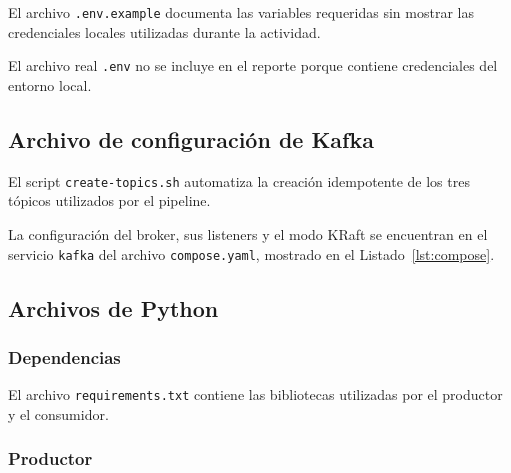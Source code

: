 

El archivo \texttt{.env.example} documenta las variables requeridas sin
mostrar las credenciales locales utilizadas durante la actividad.



El archivo real \texttt{.env} no se incluye en el reporte porque contiene
credenciales del entorno local.

\subsection{Archivo de configuración de Kafka}

El script \texttt{create-topics.sh} automatiza la creación idempotente de los
tres tópicos utilizados por el pipeline.



La configuración del broker, sus listeners y el modo KRaft se encuentran en
el servicio \texttt{kafka} del archivo \texttt{compose.yaml}, mostrado en el
Listado~\ref{lst:compose}.

\subsection{Archivos de Python}

\subsubsection{Dependencias}

El archivo \texttt{requirements.txt} contiene las bibliotecas utilizadas por
el productor y el consumidor.



\clearpage
\subsubsection{Productor}

